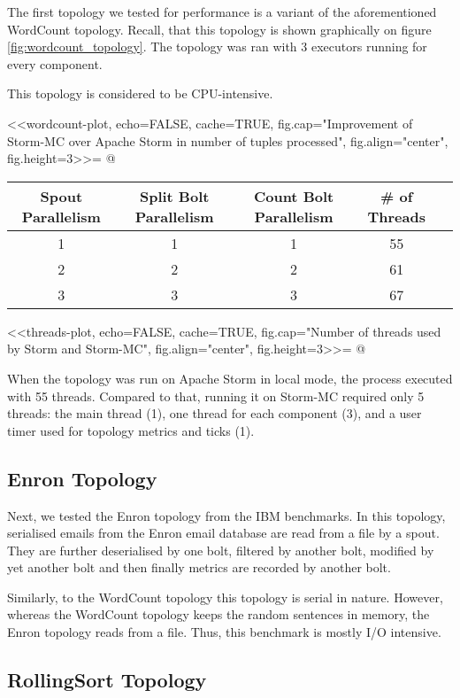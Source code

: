 The first topology we tested for performance is a variant of the aforementioned WordCount topology. Recall, that this topology is shown graphically on figure \ref{fig:wordcount_topology}. The topology was ran with 3 executors running for every component.

This topology is considered to be CPU-intensive.

<<wordcount-plot, echo=FALSE, cache=TRUE, fig.cap="Improvement of Storm-MC over Apache Storm in number of tuples processed", fig.align="center", fig.height=3>>=
@

\begin{tabular}{c c c c c} \toprule
    {Spout Parallelism} & {Split Bolt Parallelism} & {Count Bolt Parallelism} & {\# of Threads} \\ \midrule
    1 & 1 & 1 & 55  \\ \midrule
    2 & 2 & 2 & 61  \\ \midrule
    3 & 3 & 3 & 67  \\ \bottomrule
\end{tabular}

<<threads-plot, echo=FALSE, cache=TRUE, fig.cap="Number of threads used by Storm and Storm-MC", fig.align="center", fig.height=3>>=
@


When the topology was run on Apache Storm in local mode, the process executed with 55 threads. Compared to that, running it on Storm-MC required only 5 threads: the main thread (1), one thread for each component (3), and a user timer used for topology metrics and ticks (1).

\subsection{Enron Topology}

Next, we tested the Enron topology from the IBM benchmarks. In this topology, serialised emails from the Enron email database are read from a file by a spout. They are further deserialised by one bolt, filtered by another bolt, modified by yet another bolt and then finally metrics are recorded by another bolt.

Similarly, to the WordCount topology this topology is serial in nature. However, whereas the WordCount topology keeps the random sentences in memory, the Enron topology reads from a file. Thus, this benchmark is mostly I/O intensive.

\subsection{RollingSort Topology}

